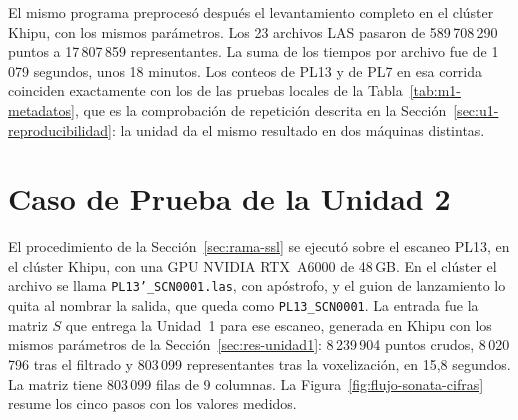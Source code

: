 El mismo programa preprocesó después el levantamiento completo en el clúster
Khipu, con los mismos parámetros. Los 23 archivos LAS pasaron de
589\,708\,290 puntos a 17\,807\,859 representantes. La suma de los tiempos por
archivo fue de 1\,079 segundos, unos 18 minutos. Los conteos de PL13 y de PL7
en esa corrida coinciden exactamente con los de las pruebas locales de la
Tabla~\ref{tab:m1-metadatos}, que es la comprobación de repetición descrita en
la Sección~\ref{sec:u1-reproducibilidad}: la unidad da el mismo resultado en dos
máquinas distintas.

\FloatBarrier
\section{Caso de Prueba de la Unidad 2}
\label{sec:res-unidad2}

El procedimiento de la Sección~\ref{sec:rama-ssl} se ejecutó sobre el escaneo
PL13, en el clúster Khipu, con una GPU NVIDIA RTX~A6000 de 48\,GB. En el clúster
el archivo se llama \texttt{PL13'\_SCN0001.las}, con apóstrofo, y el guion de
lanzamiento lo quita al nombrar la salida, que queda como
\texttt{PL13\_SCN0001}. La entrada fue la matriz $S$ que entrega la Unidad~1
para ese escaneo, generada en Khipu con los mismos parámetros de la
Sección~\ref{sec:res-unidad1}: 8\,239\,904 puntos crudos, 8\,020\,796 tras el
filtrado y 803\,099 representantes tras la voxelización, en 15{,}8 segundos. La
matriz tiene 803\,099 filas de 9 columnas. La
Figura~\ref{fig:flujo-sonata-cifras} resume los cinco pasos con los valores
medidos.

